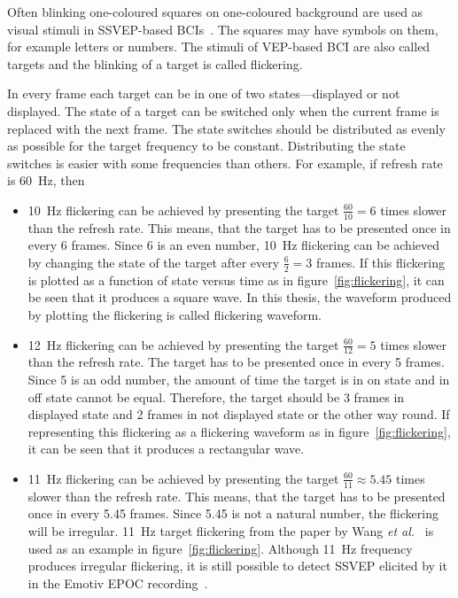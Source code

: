 Often blinking one-coloured squares on one-coloured background are used as visual stimuli in \gls{SSVEP}-based \glspl{BCI}~\cite{ssvep_stim}. The squares may have symbols on them, for example letters or numbers. The stimuli of \gls{VEP}-based \gls{BCI} are also called \glspl{target} and the blinking of a \gls{target} is called \gls{flickering}.

In every \gls{frame} each \gls{target} can be in one of two \glspl{state}---displayed or not displayed. The \gls{state} of a \gls{target} can be switched only when the current \gls{frame} is replaced with the next \gls{frame}. The \gls{state} switches should be distributed as evenly as possible for the target frequency to be constant. Distributing the \gls{state} switches is easier with some frequencies than others. For example, if \gls{refresh rate} is \SI{60}{Hz}, then
\begin{itemize}
	\item \SI{10}{Hz} \gls{flickering} can be achieved by presenting the \gls{target} $\frac{60}{10}=6$ times slower than the \gls{refresh rate}. This means, that the \gls{target} has to be presented once in every 6 \glspl{frame}. Since 6 is an even number, \SI{10}{Hz} \gls{flickering} can be achieved by changing the \gls{state} of the \gls{target} after every $\frac{6}{2} = 3$ \glspl{frame}. If this \gls{flickering} is plotted as a function of \gls{state} versus time as in figure~\ref{fig:flickering}, it can be seen that it produces a \gls{square wave}. In this thesis, the waveform produced by plotting the \gls{flickering} is called \gls{flickering waveform}.
	\item \SI{12}{Hz} \gls{flickering} can be achieved by presenting the \gls{target} $\frac{60}{12}=5$ times slower than the \gls{refresh rate}. The \gls{target} has to be presented once in every 5 \glspl{frame}. Since 5 is an odd number, the amount of time the target is in on \gls{state} and in off \gls{state} cannot be equal. Therefore, the \gls{target} should be 3 \glspl{frame} in displayed \gls{state} and 2 \glspl{frame} in not displayed \gls{state} or the other way round. If representing this \gls{flickering} as a \gls{flickering waveform} as in figure~\ref{fig:flickering}, it can be seen that it produces a \gls{rectangular wave}.
	\item \SI{11}{Hz} \gls{flickering} can be achieved by presenting the \gls{target} $\frac{60}{11}\approx 5.45$ times slower than the \gls{refresh rate}. This means, that the \gls{target} has to be presented once in every 5.45 \glspl{frame}. Since 5.45 is not a natural number, the \gls{flickering} will be irregular. \SI{11}{Hz} target \gls{flickering} from the paper by Wang \textit{et al.}~\cite{11hz} is used as an example in figure~\ref{fig:flickering}. Although \SI{11}{Hz} frequency produces irregular \gls{flickering}, it is still possible to detect \gls{SSVEP} elicited by it in the Emotiv EPOC recording~\cite{emotiv_11hz}.
\end{itemize}

